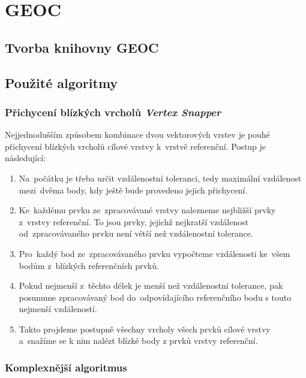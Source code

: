 \chapter{GEOC}
\label{5-geoc}

\section{Tvorba knihovny GEOC}
\label{knihovna}


\section{Použité algoritmy}
\label{algoritmy}

\subsection{ Přichycení blízkých vrcholů \textit{Vertex Snapper} }
\label{vertexsnapper}

Nejjednodušším způsobem kombinace dvou vektorových vrstev je pouhé přichycení blízkých vrcholů cílové vrstvy k~vrstvě referenční. Postup je následující:

\begin{enumerate}
 \item Na~počátku je třeba určit vzdálenostní toleranci, tedy maximální vzdálenost mezi~dvěma body, kdy ještě bude provedeno jejich přichycení.
 \item Ke~každému prvku ze~zpracovávané vrstvy nalezneme nejbližší prvky z~vrstvy referenční. To jsou prvky, jejichž nejkratší vzdálenost od~zpracovávaného prvku není větší
	než vzdálenostní tolerance.
 \item Pro~každý bod ze~zpracovávaného prvku vypočteme vzdálenosti ke~všem bodům z~blízkých referenčních prvků.
 \item Pokud nejmenší z~těchto délek je menší než vzdálenostní tolerance, pak posunume zpracovávaný bod do~odpovídajícího referenčního bodu s touto nejmenší vzdáleností.
 \item Takto projdeme postupně všechny vrcholy všech prvků cílové vrstvy a~snažíme se k nim nalézt blízké body z prvků vrstvy referenční. 
\end{enumerate}

 


\subsection{ Komplexnější algoritmus }
\label{conflation algorithm}

